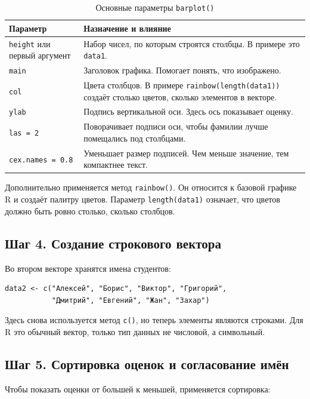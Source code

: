 \documentclass[14pt,a4paper]{extarticle}
\begin{document}
\begin{table}[H]
\caption{Основные параметры \texttt{barplot()}}
\begin{tabularx}{\textwidth}{|l|Y|}
\hline
\textbf{Параметр} & \textbf{Назначение и влияние} \\
\hline
\texttt{height} или первый аргумент & Набор чисел, по которым строятся столбцы. В примере это \texttt{data1}. \\
\hline
\texttt{main} & Заголовок графика. Помогает понять, что изображено. \\
\hline
\texttt{col} & Цвета столбцов. В примере \texttt{rainbow(length(data1))} создаёт столько цветов, сколько элементов в векторе. \\
\hline
\texttt{ylab} & Подпись вертикальной оси. Здесь ось показывает оценку. \\
\hline
\texttt{las = 2} & Поворачивает подписи оси, чтобы фамилии лучше помещались под столбцами. \\
\hline
\texttt{cex.names = 0.8} & Уменьшает размер подписей. Чем меньше значение, тем компактнее текст. \\
\hline
\end{tabularx}
\end{table}

Дополнительно применяется метод \texttt{rainbow()}. Он относится к базовой графике R и создаёт палитру цветов. Параметр \texttt{length(data1)} означает, что цветов должно быть ровно столько, сколько столбцов.

\subsection{Шаг 4. Создание строкового вектора}

Во втором векторе хранятся имена студентов:

\begin{lstlisting}
data2 <- c("Алексей", "Борис", "Виктор", "Григорий",
           "Дмитрий", "Евгений", "Жан", "Захар")
\end{lstlisting}

Здесь снова используется метод \texttt{c()}, но теперь элементы являются строками. Для R это обычный вектор, только тип данных не числовой, а символьный.

\subsection{Шаг 5. Сортировка оценок и согласование имён}

Чтобы показать оценки от большей к меньшей, применяется сортировка:
\end{document}
